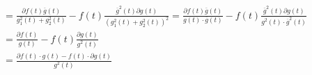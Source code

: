 \documentclass[12pt,UTF8,fontset=none]{ctexbook}
\begin{document}
\begin{align*}
%
    &= \frac{\partial f(t)\overline{g}(t)}{g_1^2(t) + g_2^2 (t)} - f(t)\frac{ \overline{g}^2(t) \partial g(t) }{\left(g_1^2(t) + g_2^2 (t)\right)^2} = \frac{\partial f(t)\overline{g}(t)}{g(t) \cdot \overline{g}(t)} - f(t)\frac{ \overline{g}^2(t) \partial g(t) }{g^2(t) \cdot \overline{g}^2(t)} \\
    &= \frac{\partial f(t)}{g(t)} - f(t)\frac{  \partial g(t) }{g^2(t) } \\
    &= \frac{\partial f(t) \cdot g(t) - f(t) \cdot \partial g(t) }{g^2(t) }
\end{align*}
\end{document}
